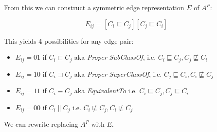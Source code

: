 From this we can construct a symmetric edge representation $E$ of $A^P$:

\begin{equation}
E_{ij} = [ C_i \sqsubseteq C_j] [ C_j \sqsubseteq C_i ]
\end{equation}

This yields 4 possibilities for any edge pair:

\begin{itemize}
\item[] $E_{ij} = 01$ if $C_i \sqsubset C_j$ aka \emph{Proper SubClassOf}, i.e. $C_i \sqsubseteq C_j, C_j \not\sqsubseteq C_i$
\item[] $E_{ij} = 10$ if $C_i \sqsupset C_j$ aka \emph{Proper SuperClassOf}, i.e.  $C_j \sqsubseteq C_i, C_i \not\sqsubseteq C_j$
\item[] $E_{ij} = 11$ if $C_i \equiv C_j$ aka \emph{EquivalentTo} i.e. $C_i \sqsubseteq C_j, C_j \sqsubseteq C_i$
\item[] $E_{ij} = 00$ if $C_i \parallel C_j$ i.e. $C_i \not\sqsubseteq C_j, C_i \not\sqsubseteq C_j$
\end{itemize}

We can rewrite  replacing $A^P$ with $E$.
